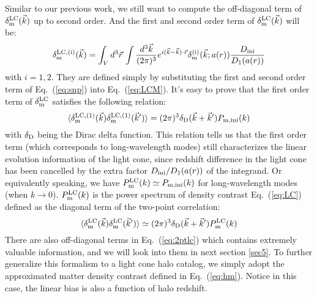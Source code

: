 \documentclass[prd,amsmath,amssymb,floatfix,superscriptaddress,nofootinbib,twocolumn]{revtex4-1}
\def\be{\begin{equation}}
\def\ee{\end{equation}}
\newcommand{\LC}{\rm LC}
\newcommand{\ini}{\rm ini}
\newcommand{\vrr}{\vec{r}}
\newcommand{\vk}{\vec{k}}
\newcommand{\ec}[1]{Eq.~(\ref{eq:#1})}
\newcommand{\eql}[1]{\label{eq:#1}}
\begin{document}
Similar to our previous work, we still want to compute the off-diagonal term of $\delta^{\LC}_{\rm m}(\vk)$ up to second order. And the first and second order term of $\delta^{\LC}_{\rm m}(\vk)$ will be:
\be 
\delta^{\LC,(\rm i)}_{\rm m}(\vk)=\int_{V} d^3\vrr  \, \int \frac{d^3 \vk}{(2\pi)^3}e^{i(\vk-\vk)\cdot\vrr}\delta^{(\rm i)}_{\rm m}(\vk;a(r))\frac{D_{\ini}}{D_{1}(a(r))}  \eql{exp}
\ee 
with $i=1,2$. They are defined simply by substituting the first and second order term of \ec{snp} into \ec{LCM}. It's easy to prove that the first order term of $\delta^{\LC}_{\rm m}$ satisfies the following relation:
\be 
\langle \delta^{\LC,(\rm 1)}_{\rm m}(\vk) \delta^{\LC,(\rm 1)}_{\rm m}(\vk') \rangle = (2\pi)^3 \delta_{\rm D}(\vk+\vk')P_{\rm m,ini}(k)\eql{lps}
\ee 
with $\delta_{\rm D}$ being the Dirac delta function. This relation tells us that the first order term (which corresponds to long-wavelength modes) still characterizes the linear evolution information of the light cone, since redshift difference in the light cone has been cancelled by the extra factor $D_{\ini}/D_{1}(a(r))$ of the integrand. Or equivalently speaking, we have $P_{\rm m}^{\rm LC}(k)\simeq P_{\rm m,ini}(k)$ for long-wavelength modes (when $k\rightarrow 0$). $P_{\rm m}^{\rm LC}(k)$ is the power spectrum of density contrast \ec{LC} defined as the diagonal term of the two-point correlation:
\be 
\langle \delta_{\rm m}^{\rm LC} (\vk)\delta_{\rm m}^{\rm LC}(\vk')\rangle \simeq (2\pi)^3 \delta_{\rm D}(\vk+\vk')P_{\rm m}^{\rm LC}(k) \eql{2ptlc}
\ee 
There are also off-diagonal terms in \ec{2ptlc} which contains extremely valuable information, and we will look into them in next section \ref{sec5}. To further generalize this formalism to a light cone halo catalog, we simply adopt the approximated matter density contrast defined in \ec{hm}. Notice in this case, the linear bias is also a function of halo redshift.
\end{document}
